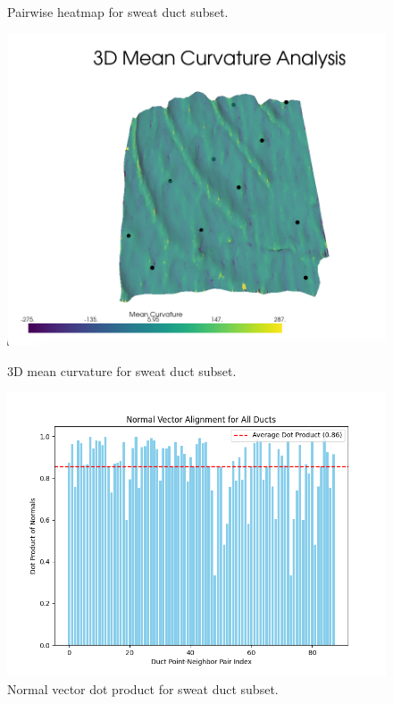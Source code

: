 \documentclass[12pt, twoside]{report}
\begin{document}
\begin{figure}[htp]
\begin{minipage}{0.41\textwidth}
        \caption{Pairwise heatmap for sweat duct subset.}
        \label{fig:additional_figure_2}
    \end{minipage}
    
    \vspace{0.5cm}
    
    \begin{minipage}{0.41\textwidth}
        \centering
        \includegraphics[width=\textwidth]{images/croppedSD_3D_mean_curvature.png}
        \caption{3D mean curvature for sweat duct subset.}
        \label{fig:additional_figure_3}
    \end{minipage}
    \hfill
    \begin{minipage}{0.41\textwidth}
        \centering
        \includegraphics[width=\textwidth]{images/cropped_normal_dot_product.png}
        \caption{Normal vector dot product for sweat duct subset.}
        \label{fig:additional_figure_4}
    \end{minipage}
\end{figure}
\end{document}
